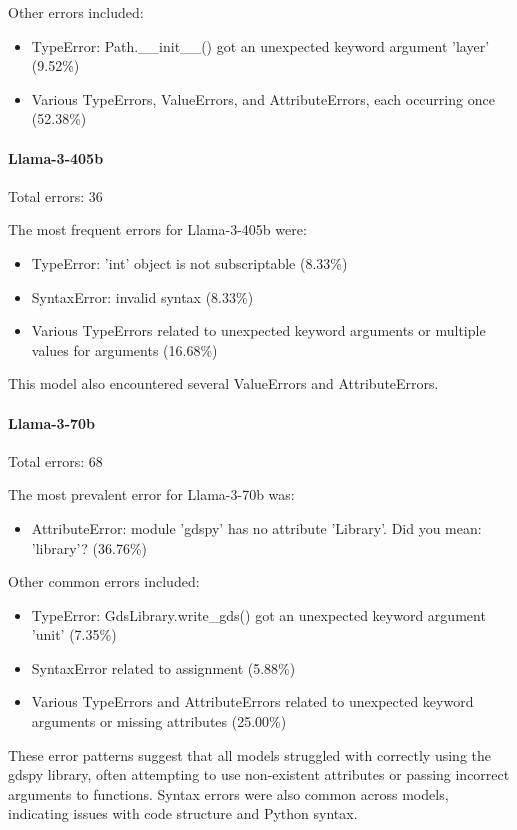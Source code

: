 \documentclass{article}
\begin{document}
Other errors included:
\begin{itemize}
    \item TypeError: Path.\_\_init\_\_() got an unexpected keyword argument 'layer' (9.52\%)
    \item Various TypeErrors, ValueErrors, and AttributeErrors, each occurring once (52.38\%)
\end{itemize}

\paragraph{Llama-3-405b}
Total errors: 36

The most frequent errors for Llama-3-405b were:
\begin{itemize}
    \item TypeError: 'int' object is not subscriptable (8.33\%)
    \item SyntaxError: invalid syntax (8.33\%)
    \item Various TypeErrors related to unexpected keyword arguments or multiple values for arguments (16.68\%)
\end{itemize}

This model also encountered several ValueErrors and AttributeErrors.

\paragraph{Llama-3-70b}
Total errors: 68

The most prevalent error for Llama-3-70b was:
\begin{itemize}
    \item AttributeError: module 'gdspy' has no attribute 'Library'. Did you mean: 'library'? (36.76\%)
\end{itemize}

Other common errors included:
\begin{itemize}
    \item TypeError: GdsLibrary.write\_gds() got an unexpected keyword argument 'unit' (7.35\%)
    \item SyntaxError related to assignment (5.88\%)
    \item Various TypeErrors and AttributeErrors related to unexpected keyword arguments or missing attributes (25.00\%)
\end{itemize}

These error patterns suggest that all models struggled with correctly using the gdspy library, often attempting to use non-existent attributes or passing incorrect arguments to functions. Syntax errors were also common across models, indicating issues with code structure and Python syntax.
\end{document}
